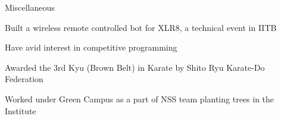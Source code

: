 \documentclass{resume} %
\begin{document}
\begin{rSection}{Miscellaneous}
\begin{rSubsection}{}{}{}{}
\item Built a wireless remote controlled bot for XLR8, a technical event in IITB
\item Have avid interest in competitive programming
\item Awarded the 3rd Kyu (Brown Belt) in Karate by Shito Ryu Karate-Do Federation
\item Worked under Green Campus as a part of NSS team planting trees in the Institute
\end{rSubsection}
\end{rSection}





\end{document}

